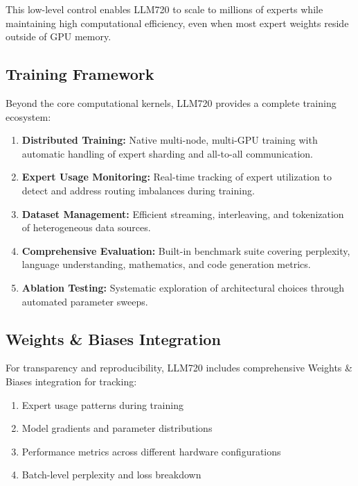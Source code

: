\documentclass[11pt]{article}
\begin{document}
This low-level control enables LLM720 to scale to millions of experts while maintaining high computational efficiency, even when most expert weights reside outside of GPU memory. 

\subsection{Training Framework}

Beyond the core computational kernels, LLM720 provides a complete training ecosystem:

\begin{enumerate}
    \item \textbf{Distributed Training:} Native multi-node, multi-GPU training with automatic handling of expert sharding and all-to-all communication.
    
    \item \textbf{Expert Usage Monitoring:} Real-time tracking of expert utilization to detect and address routing imbalances during training.
    
    \item \textbf{Dataset Management:} Efficient streaming, interleaving, and tokenization of heterogeneous data sources.
    
    \item \textbf{Comprehensive Evaluation:} Built-in benchmark suite covering perplexity, language understanding, mathematics, and code generation metrics.
    
    \item \textbf{Ablation Testing:} Systematic exploration of architectural choices through automated parameter sweeps.
\end{enumerate}

\subsection{Weights \& Biases Integration}

For transparency and reproducibility, LLM720 includes comprehensive Weights \& Biases integration for tracking:

\begin{enumerate}
    \item Expert usage patterns during training
    \item Model gradients and parameter distributions
    \item Performance metrics across different hardware configurations
    \item Batch-level perplexity and loss breakdown
\end{enumerate}
\end{document}

